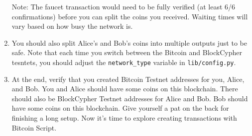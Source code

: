 \documentclass[11pt]{article}
\begin{document}
\begin{enumerate}
    Note: The faucet transaction would need to be fully verified (at least 6/6 confirmations) before you can split the coins you received. Waiting times will vary based on how busy the network is.
    
    \item You should also split Alice's and Bob's coins into multiple outputs just to be safe. Note that each time you switch between the Bitcoin and BlockCypher tesntets, you should adjust the \texttt{network\_type} variable in \texttt{lib/config.py}.
    \item At the end, verify that you created Bitcoin Testnet addresses for you,  Alice, and Bob. You and Alice should have some coins on this blockchain. There should also be BlockCypher Testnet addresses for Alice and Bob. Bob should have some coins on this blockchain. Give yourself a pat on the back for finishing a long setup. Now it's time to explore creating transactions with Bitcoin Script.
\end{enumerate}
\end{document}
